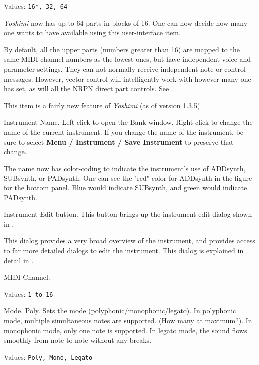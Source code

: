    Values: \texttt{16*, 32, 64}

   \textsl{Yoshimi} now has up to 64 parts in blocks of 16. One can now
   decide how many one wants to have available using this user-interface
   item.

   By default, all the upper parts (numbers greater than 16)
   are mapped to the same MIDI channel
   numbers as the lowest ones, but have independent voice and parameter
   settings. They can not normally receive independent note or control
   messages. However, vector control will intelligently work with however
   many one has set, as will all the NRPN direct part controls.
   See .

   This item is a fairly new feature of \textsl{Yoshimi} (as of version
   1.3.5).
   
   Instrument Name.
   Left-click to open the Bank window.
   Right-click to change the name of the current instrument.
   If you change the name of the instrument, be sure to select
   \textbf{Menu / Instrument / Save Instrument} to preserve that change.

   The name now has color-coding to indicate the instrument's use of
   ADDsynth, SUBsynth, or PADsynth.  One can see the "red" color for ADDsynth
   in the figure for the bottom panel.  Blue would indicate SUBsynth, and
   green would indicate PADsynth.

   Instrument Edit button.
   This button brings up the instrument-edit dialog shown in
   .

   This dialog provides a very broad overview of the instrument, and
   provides access to far more detailed dialogs to edit the instrument.
   This dialog is explained in detail in
   .

   MIDI Channel.

   Values: \texttt{1 to 16}

   Mode. Poly.
   Sets the mode (polyphonic/monophonic/legato).
   In polyphonic mode, multiple simultaneous notes are supported.
   (How many at maximum?).
   In monophonic mode, only one note is supported.
   In legato mode, the sound flows smoothly from note to note without
   any breaks.

   Values: \texttt{Poly, Mono, Legato}

